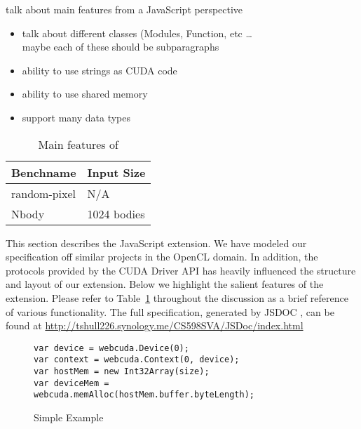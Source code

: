 

talk about main features from a JavaScript perspective
\begin{itemize}
\item talk about different classes (Modules, Function, etc \ldots\\
maybe each of these should be subparagraphs
\item ability to use strings as CUDA code
\item ability to use shared memory
\item support many data types
\end{itemize}

\begin{table}
\begin{center}
\begin{tabular}{| l | l |}
\hline
Benchname & Input Size \\
\hline
random-pixel & N/A \\
\hline
Nbody &  1024 bodies \\
\hline
\end{tabular}
\end{center}
\caption{Main features of \name}
\label{webcudaSpec}
\end{table}

This section describes the \name JavaScript extension. We have modeled our
specification off similar projects \cite{webCL, nokiaCL, amdCL} in the OpenCL
domain.  In addition, the protocols provided by the CUDA Driver API
\cite{cudaAPI} has heavily influenced the structure and layout of our extension.
Below we highlight the salient features of the extension. Please refer to
Table~\ref{webcudaSpec} throughout the discussion as a brief reference of
various \name functionality. The full \name specification, generated by JSDOC
\cite{JSDOC}, can be found at
\url{http://tshull226.synology.me/CS598SVA/JSDoc/index.html}


\begin{figure*}
	\begin{center}
\begin{lstlisting}[frame=single]
var device = webcuda.Device(0);
var context = webcuda.Context(0, device);
var hostMem = new Int32Array(size);
var deviceMem = webcuda.memAlloc(hostMem.buffer.byteLength);
\end{lstlisting}
\end{center}
\caption{Simple \name Example}
\label{codeExample}
\end{figure*}

